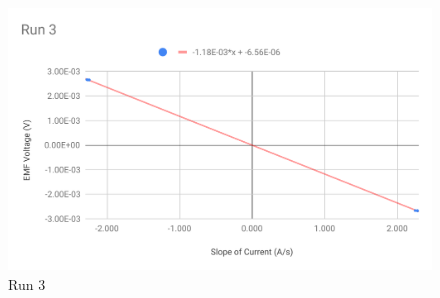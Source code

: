 \begin{figure}[ht]
	\centering
	\includegraphics[scale=0.74]{image/04-faraday/run-3.pdf}
	\caption{Run 3}
	\label{figure.04.run.3}
\end{figure}